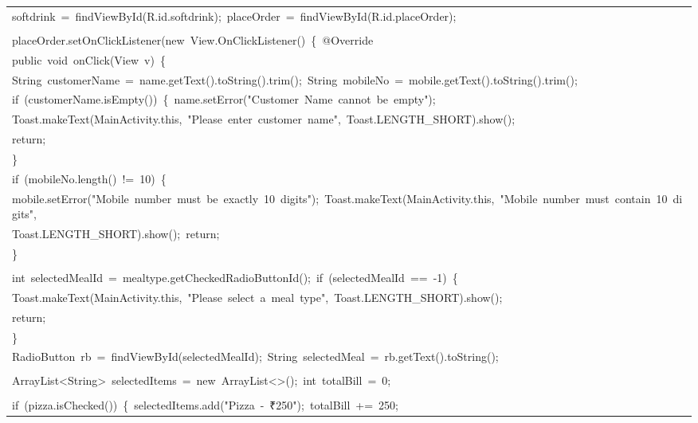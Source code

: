 \documentclass[a4paper,12pt]{article}
\begin{document}
\begin{longtable}{|p{}|}
{\ttfamily\small softdrink\ =\ findViewById(R.id.softdrink);\ placeOrder\ =\ findViewById(R.id.placeOrder);} \\
\strut \\
{\ttfamily\small placeOrder.setOnClickListener(new\ View.OnClickListener()\ \{\ @Override} \\
{\ttfamily\small public\ void\ onClick(View\ v)\ \{} \\
{\ttfamily\small String\ customerName\ =\ name.getText().toString().trim();\ String\ mobileNo\ =\ mobile.getText().toString().trim();} \\
{\ttfamily\small if\ (customerName.isEmpty())\ \{\ name.setError("Customer\ Name\ cannot\ be\ empty");} \\
{\ttfamily\small Toast.makeText(MainActivity.this,\ "Please\ enter\ customer\ name",\ Toast.LENGTH\_SHORT).show();} \\
{\ttfamily\small return;} \\
{\ttfamily\small \}} \\
{\ttfamily\small if\ (mobileNo.length()\ !=\ 10)\ \{} \\
{\ttfamily\small mobile.setError("Mobile\ number\ must\ be\ exactly\ 10\ digits");\ Toast.makeText(MainActivity.this,\ "Mobile\ number\ must\ contain\ 10\ digits",} \\
{\ttfamily\small Toast.LENGTH\_SHORT).show();\ return;} \\
{\ttfamily\small \}} \\
\strut \\
{\ttfamily\small int\ selectedMealId\ =\ mealtype.getCheckedRadioButtonId();\ if\ (selectedMealId\ ==\ -1)\ \{} \\
{\ttfamily\small Toast.makeText(MainActivity.this,\ "Please\ select\ a\ meal\ type",\ Toast.LENGTH\_SHORT).show();} \\
{\ttfamily\small return;} \\
{\ttfamily\small \}} \\
{\ttfamily\small RadioButton\ rb\ =\ findViewById(selectedMealId);\ String\ selectedMeal\ =\ rb.getText().toString();} \\
\strut \\
{\ttfamily\small ArrayList\textless{}String\textgreater{}\ selectedItems\ =\ new\ ArrayList\textless{}\textgreater{}();\ int\ totalBill\ =\ 0;} \\
\strut \\
{\ttfamily\small if\ (pizza.isChecked())\ \{\ selectedItems.add("Pizza\ -\ ₹250");\ totalBill\ +=\ 250;} \\

\end{longtable}
\end{document}

